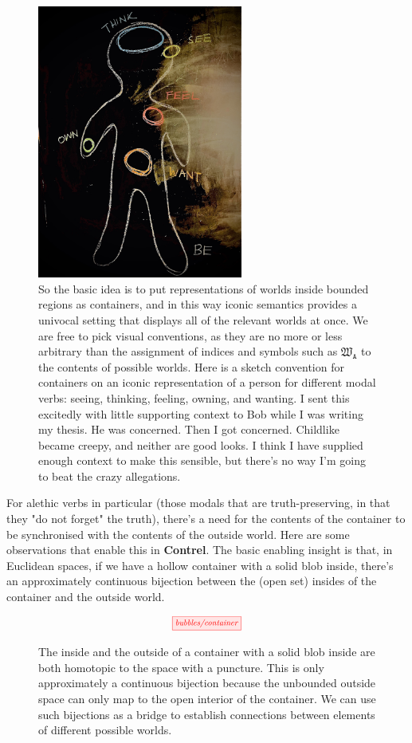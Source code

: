 \begin{figure}[h!]
    \centering
    \includegraphics[height=9cm]{figures/bubbles/creepy}
    \caption{So the basic idea is to put representations of worlds inside bounded regions as containers, and in this way iconic semantics provides a univocal setting that displays all of the relevant worlds at once. We are free to pick visual conventions, as they are no more or less arbitrary than the assignment of indices and symbols such as $\mathfrak{W}_{\texttt{A}}$ to the contents of possible worlds. Here is a sketch convention for containers on an iconic representation of a person for different modal verbs: seeing, thinking, feeling, owning, and wanting. I sent this excitedly with little supporting context to Bob while I was writing my thesis. He was concerned. Then I got concerned. Childlike became creepy, and neither are good looks. I think I have supplied enough context to make this sensible, but there's no way I'm going to beat the crazy allegations.}
    \label{fig:creepy}
\end{figure}

For alethic verbs in particular (those modals that are truth-preserving, in that they "do not forget" the truth), there's a need for the contents of the container to be synchronised with the contents of the outside world. Here are some observations that enable this in \textbf{Contrel}. The basic enabling insight is that, in Euclidean spaces, if we have a hollow container with a solid blob inside, there's an approximately continuous bijection between the (open set) insides of the container and the outside world.

\clearpage

\begin{figure}[h!]
\centering
\[\scalebox{0.75}{\tikzfig{bubbles/container}}\]
\caption{The inside and the outside of a container with a solid blob inside are both homotopic to the space with a puncture. This is only approximately a continuous bijection because the unbounded outside space can only map to the open interior of the container. We can use such bijections as a bridge to establish connections between elements of different possible worlds.}
\label{fig:creepy}
\end{figure}

